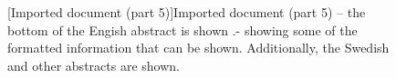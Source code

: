 \begin{figure}[!ht]
  \begin{center}
  \end{center}
  \caption{[Imported document (part 5)]Imported document (part 5) – the bottom of the Engish abstract is shown .- showing some of the formatted information that can be shown. Additionally, the Swedish and other abstracts are shown.}
  \label{fig:divaImport9}
\end{figure}
\FloatBarrier

